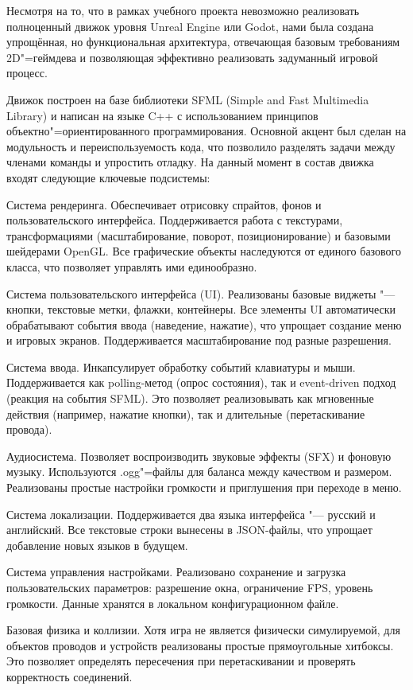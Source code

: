 Несмотря на то, что в рамках учебного проекта невозможно реализовать полноценный движок уровня Unreal Engine или Godot, нами была создана упрощённая, но функциональная архитектура, отвечающая базовым требованиям 2D"=геймдева и позволяющая эффективно реализовать задуманный игровой процесс.\cite{GameDev}

Движок построен на базе библиотеки SFML (Simple and Fast Multimedia Library) и написан на языке C++ с использованием принципов объектно"=ориентированного программирования. Основной акцент был сделан на модульность и переиспользуемость кода, что позволило разделять задачи между членами команды и упростить отладку.
На данный момент в состав движка входят следующие ключевые подсистемы:

Система рендеринга. Обеспечивает отрисовку спрайтов, фонов и пользовательского интерфейса. Поддерживается работа с текстурами, трансформациями (масштабирование, поворот, позиционирование) и базовыми шейдерами OpenGL. Все графические объекты наследуются от единого базового класса, что позволяет управлять ими единообразно.

Система пользовательского интерфейса (UI). Реализованы базовые виджеты "--- кнопки, текстовые метки, флажки, контейнеры. Все элементы UI автоматически обрабатывают события ввода (наведение, нажатие), что упрощает создание меню и игровых экранов. Поддерживается масштабирование под разные разрешения.

Система ввода. Инкапсулирует обработку событий клавиатуры и мыши. Поддерживается как polling-метод (опрос состояния), так и event-driven подход (реакция на события SFML). Это позволяет реализовывать как мгновенные действия (например, нажатие кнопки), так и длительные (перетаскивание провода).

Аудиосистема. Позволяет воспроизводить звуковые эффекты (SFX) и фоновую музыку. Используются .ogg"=файлы для баланса между качеством и размером. Реализованы простые настройки громкости и приглушения при переходе в меню.

Система локализации. Поддерживается два языка интерфейса "--- русский и английский. Все текстовые строки вынесены в JSON-файлы, что упрощает добавление новых языков в будущем.

Система управления настройками. Реализовано сохранение и загрузка пользовательских параметров: разрешение окна, ограничение FPS, уровень громкости. Данные хранятся в локальном конфигурационном файле.

Базовая физика и коллизии. Хотя игра не является физически симулируемой, для объектов проводов и устройств реализованы простые прямоугольные хитбоксы. Это позволяет определять пересечения при перетаскивании и проверять корректность соединений.

